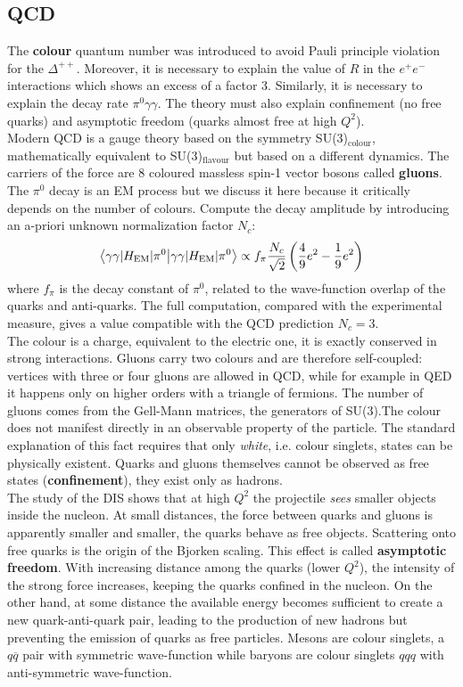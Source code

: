 \documentclass[10.75pt,a4paper,openright,bottom=2cm]{article}
\begin{document}
\subsection{QCD}
The \textbf{colour} quantum number was introduced to avoid Pauli principle violation for the $\Delta^{++}$. Moreover, it is necessary to explain the value of $R$ in the $e^+e^-$ interactions which shows an excess of a factor 3. Similarly, it is necessary to explain the decay rate $\pi^0\gamma\gamma$. The theory must also explain confinement (no free quarks) and asymptotic freedom (quarks almost free at high $Q^2$).\\
Modern QCD is a gauge theory based on the symmetry SU(3)$_{\text{colour}}$, mathematically equivalent to SU(3)$_{\text{flavour}}$ but based on a different dynamics. The carriers of the force are 8 coloured massless spin-1 vector bosons called \textbf{gluons}.\\
The $\pi^0$ decay is an EM process but we discuss it here because it critically depends on the number of colours. Compute the decay amplitude by introducing an a-priori unknown normalization factor $N_c$:
\[
\braket{\gamma\gamma|H_{\text{EM}}|\pi^0}\propto f_\pi\frac{N_c}{\sqrt{2}}\left(\frac{4}{9}e^2-\frac{1}{9}e^2\right)
\]
where $f_\pi$ is the decay constant of $\pi^0$, related to the wave-function overlap of the quarks and anti-quarks. The full computation, compared with the experimental measure, gives a value compatible with the QCD prediction $N_c=3$.\\
The colour is a charge, equivalent to the electric one, it is exactly conserved in strong interactions. Gluons carry two colours and are therefore self-coupled: vertices with three or four gluons are allowed in QCD, while for example in QED it happens only on higher orders with a triangle of fermions. The number of gluons comes from the Gell-Mann matrices, the generators of SU(3).The colour does not manifest directly in an observable property of the particle. The standard explanation of this fact requires that only \textit{white}, i.e. colour singlets, states can be physically existent. Quarks and gluons themselves cannot be observed as free states (\textbf{confinement}), they exist only as hadrons.\\
The study of the DIS shows that at high $Q^2$ the projectile \textit{sees} smaller objects inside the nucleon. At small distances, the force between quarks and gluons is apparently smaller and smaller, the quarks behave as free objects. Scattering onto free quarks is the origin of the Bjorken scaling. This effect is called \textbf{asymptotic freedom}. With increasing distance among the quarks (lower $Q^2$), the intensity of the strong force increases, keeping the quarks confined in the nucleon. On the other hand, at some distance the available energy becomes sufficient to create a new quark-anti-quark pair, leading to the production of new hadrons but preventing the emission of quarks as free particles. Mesons are colour singlets, a $q\overline{q}$ pair with symmetric wave-function while baryons are colour singlets $qqq$ with anti-symmetric wave-function.\\
\end{document}
